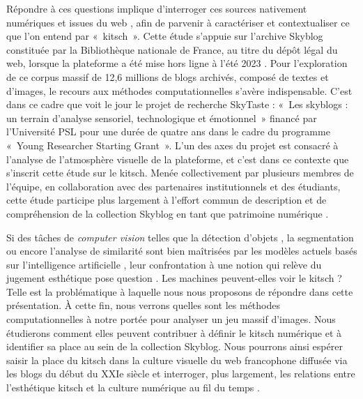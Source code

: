 \documentclass[final, fra]{anthology-ch}     %
\begin{document}
Répondre à ces questions implique d’interroger ces sources nativement numériques et issues du web  \cite{BRUGGERArchivedWebDoing2023, MUSIANIQuestcequunearchive2019, BERMESwebcommesource2025}, afin de parvenir à caractériser et contextualiser ce que l’on entend par «~kitsch~». Cette étude s’appuie sur l’archive Skyblog constituée par la Bibliothèque nationale de France, au titre du dépôt légal du web, lorsque la plateforme a été mise hors ligne à l’été 2023 \cite{FAYEetaitfoisSkyblog2024}. Pour l’exploration de ce corpus massif de 12,6 millions de blogs archivés, composé de textes et d’images, le recours aux méthodes computationnelles s’avère indispensable.  C’est dans ce cadre que voit le jour le projet de recherche SkyTaste : «~Les skyblogs : un terrain d'analyse sensoriel, technologique et émotionnel~» financé par l'Université PSL pour une durée de quatre ans dans le cadre du programme «~Young Researcher Starting Grant~». L'un des axes du projet est consacré à l’analyse de l’atmosphère visuelle de la plateforme, et c'est dans ce contexte que s’inscrit cette étude sur le kitsch. Menée collectivement par plusieurs membres de l’équipe, en collaboration avec des partenaires institutionnels et des étudiants, cette étude participe plus largement à l’effort commun de description et de compréhension de la collection Skyblog \cite{LOBBEmigrations2025, BigotChroniques2025} en tant que patrimoine numérique  \cite{FAYEAujourdhuiskyblogsentrent2024, CARDONCulturenumerique2019a, BERMESlecranlemotionquand2024}.
\newline

Si des tâches de \textit{computer vision} telles que la détection d’objets \cite{charpier_tiamat_2026}, la segmentation ou encore l’analyse de similarité sont bien maîtrisées par les modèles actuels basés sur l’intelligence artificielle \cite{bermes_image_2023, kee_seeing_2019}, leur confrontation à une notion qui relève du jugement esthétique pose question  \cite{taylor_distant_2023}. Les machines peuvent-elles voir le kitsch ? Telle est la problématique à laquelle nous nous proposons de répondre dans cette présentation. 
\newline À cette fin, nous verrons quelles sont les méthodes computationnelles à notre portée pour analyser un jeu massif d’images. Nous étudierons comment elles peuvent contribuer à définir le kitsch numérique  \cite{QUARANTADigitalKitschArt2023} et à identifier sa place au sein de la collection Skyblog. Nous pourrons ainsi espérer saisir la place du kitsch dans la culture visuelle du web francophone diffusée via les blogs du début du XXIe siècle et interroger, plus largement, les relations entre l’esthétique kitsch et la culture numérique au fil du temps  \cite{CARDONCulturenumerique2019a, CUBITTAestheticsDigital2016}.  
\end{document}
